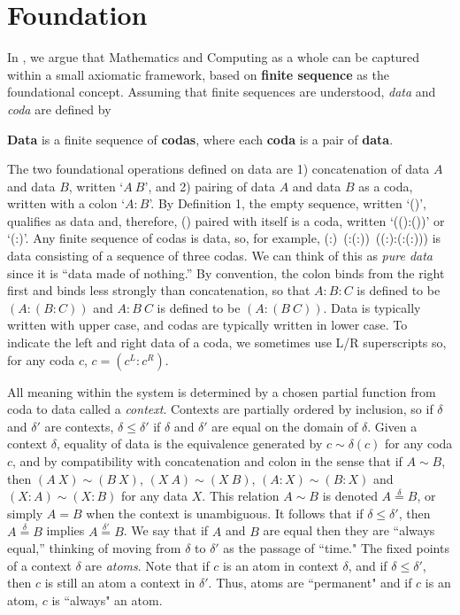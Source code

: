\documentclass[11pt]{article}
\begin{document}
\section{Foundation}  

In \cite{PDF}, we argue that Mathematics and Computing as a whole can be captured within a small axiomatic framework, 
based on {\bf finite sequence} as the foundational concept.  Assuming that finite sequences are understood, {\it data} and {\it coda} are defined by 

\begin{definition} {{\bf Data} is a finite sequence of {\bf codas}, where each {\bf coda} is a pair of {\bf data}.}
\end{definition}

\noindent The two foundational operations defined on data are 1) concatenation of data $A$ and data $B$, written `$A\ B$', and 2) pairing of data $A$ and data $B$ as a coda, written with a colon `$A:B$'.   
By Definition 1, the empty sequence, written `()', qualifies as data and, therefore, () paired with itself is a coda, written `(():())' or `(:)'.  
Any finite sequence of codas is data, so, for example, (:)\ (:(:))\ ((:):(:(:))) is  
data consisting of a sequence of three codas.  We can think of this as {\it pure data} since it is ``data made of nothing.''  
By convention, the colon binds from the right first and binds less strongly than concatenation, so that $A:B:C$ is defined to be $(A:(B:C))$ and $A:B\ C$ is defined to be $(A:(B\ C))$.  
Data is typically written with upper case, and codas are typically written in lower case.  
To indicate the left and right data of a coda, we sometimes use L/R superscripts so, for any coda $c$, $c=(c^L:c^R)$. 

     All meaning within the system is determined by a chosen partial function from coda to data called a {\it context}. 
Contexts are partially ordered by inclusion, so if $\delta$ and $\delta'$ are contexts, $\delta\le\delta'$ if $\delta$ and $\delta'$ are equal on the domain of $\delta$.  
Given a context $\delta$, equality of data is the equivalence generated by $c\sim \delta(c)$ for any coda $c$, and by compatibility with concatenation and colon in the sense that 
if $A\sim B$, then $(A\ X)\sim (B\ X)$, $(X\ A)\sim (X\ B)$, $(A:X)\sim (B:X)$ and $(X:A)\sim(X:B)$ for any data $X$.  This relation $A\sim B$ is denoted $A{\overset\delta =}B$, 
or simply $A=B$ when the context is unambiguous.   
It follows that if $\delta\leq\delta'$, then $A{\overset\delta =}B$ implies $A{\overset{\delta'} =}B$.  We say that if $A$ and $B$ are equal then they are ``always equal,'' thinking 
of moving from $\delta$ to $\delta'$ as the passage of ``time."  The fixed points of a context $\delta$ are {\it atoms}.  Note that if $c$ is an atom in context $\delta$, 
and if $\delta\leq\delta'$, then $c$ is still an atom a context in $\delta'$.  Thus, atoms are ``permanent" and if $c$ is an atom, $c$ is ``always" an atom.  
\end{document}
